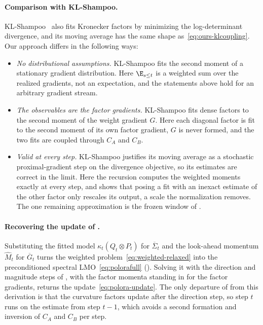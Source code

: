 \paragraph{Comparison with KL-Shampoo.} KL-Shampoo~\cite{klshampoo}
also fits Kronecker factors by minimizing the log-determinant
divergence, and its moving average has the same shape
as~\eqref{eq:ours-klcoupling}. Our approach differs in the following ways:
\begin{itemize}[leftmargin=1.5em,itemsep=1pt,topsep=2pt]
  \item \emph{No distributional assumptions.} KL-Shampoo fits the second moment
  of a stationary gradient distribution. Here $\E_{s \leq t}$ is a weighted sum
  over the realized gradients, not an expectation, and the statements
  above hold for an arbitrary gradient stream.
  \item \emph{The observables are the factor gradients.} KL-Shampoo fits
  dense factors to the second moment of the weight gradient $G$. Here
  each diagonal factor is fit to the second moment of its own factor
  gradient, $G$ is never formed, and the two fits are coupled through
  $C_A$ and $C_B$.
  \item \emph{Valid at every step.} KL-Shampoo justifies its
  moving average as a stochastic proximal-gradient step on the
  divergence objective, so its estimates are correct in the limit. Here
  the recursion computes the weighted moments exactly at every step,
  and  shows that posing a fit with an inexact
  estimate of the other factor only rescales its output, a scale the
  normalization removes. The one remaining approximation is the frozen
  window of .
\end{itemize}

\paragraph{Recovering the update of .} Substituting the
fitted model $\kappa_t(Q_t\otimes P_t)$ for $\overline\Sigma_t$ and the
look-ahead momentum $\widehat M_t$ for $\overline G_t$ turns the
weighted problem~\eqref{eq:weighted-relaxed} into the preconditioned
spectral LMO~\eqref{eq:polorafull}
(). Solving it with the direction and
magnitude steps of , with the factor momenta
standing in for the factor gradients, returns the
update~\eqref{eq:polora-update}. The only departure of 
from this derivation is that the curvature factors update after the
direction step, so step $t$ runs on the estimate from step $t-1$, which
avoids a second formation and inversion of $C_A$ and $C_B$ per step.

